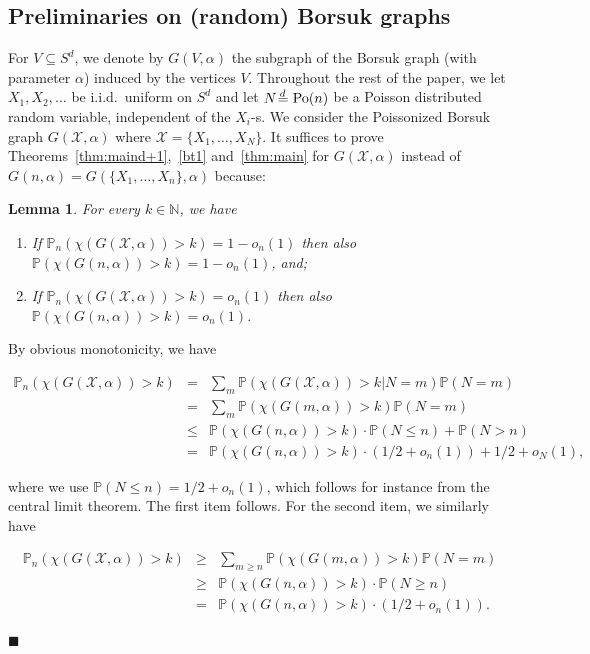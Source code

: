 \documentclass[11pt]{article}%
\newenvironment{proof}{\vspace{1ex}\noindent{\bf Proof.}}{\hspace*{\fill}$\blacksquare$\vspace{1ex}}
\newtheorem{lemma}[lemma]{Lemma}
\newcommand{\Xcal}[0]{\ensuremath{{\mathcal X}}}
\newcommand{\eN}[0]{\ensuremath{ \mathbb N}}
\newcommand{\Pee}[0]{\ensuremath{{\mathbb P}}}
\newcommand{\isd}[0]{\hspace{.2ex} \raisebox{-.1ex}{$=$} \hspace{-1.5ex} 
\raisebox{1ex}{{$\scriptstyle d$}} \hspace{.8ex} }
\DeclareMathOperator{\Po}{Po}
\begin{document}
\subsection{Preliminaries on (random) Borsuk graphs}


For $V \subseteq S^d$, we denote by $G(V,\alpha)$ the subgraph of the Borsuk graph (with parameter $\alpha$) induced
by the vertices $V$.
Throughout the rest of the paper, we let $X_1,X_2,\dots$ be i.i.d.~uniform on $S^d$ and 
let $N \isd \Po(n)$ be a Poisson distributed random 
variable, independent of the $X_i$-s. 
We consider the Poissonized Borsuk graph $G(\Xcal,\alpha)$ where $\Xcal = \{X_1,\dots,X_N\}$.
It suffices to prove Theorems~\ref{thm:maind+1},~\ref{bt1} and~\ref{thm:main} for $G(\Xcal,\alpha)$ instead of 
$G(n,\alpha) = G(\{X_1,\dots,X_n\},\alpha)$ because:

\begin{lemma}\label{lem:transferPo}
For every $k \in \eN$, we have 
\begin{enumerate}
\item If $\Pee_n(\chi(G(\Xcal,\alpha))> k) = 1-o_n(1)$ then also 
$\Pee(\chi(G(n,\alpha))> k) = 1-o_n(1)$, and;
\item If $\Pee_n(\chi(G(\Xcal,\alpha))> k) = o_n(1)$ then also 
$\Pee(\chi(G(n,\alpha))> k) = o_n(1)$.
\end{enumerate}
\end{lemma}

\begin{proof} By obvious monotonicity, we have 

$$ \begin{array}{rcl} 
\Pee_n(\chi(G(\Xcal,\alpha))> k)
& = & \sum_{m} \Pee( \chi(G(\Xcal,\alpha))> k | N = m ) \Pee( N=m )\\
& = & \sum_{m} \Pee( \chi(G(m,\alpha))> k ) \Pee( N=m )\\
& \leq & \Pee( \chi(G(n,\alpha)) > k ) \cdot \Pee( N\leq n) + \Pee( N > n ) \\
& = & \Pee( \chi(G(n,\alpha)) > k ) \cdot (1/2+o_n(1)) + 1/2+o_N(1),
\end{array} $$

\noindent
where we use $\Pee( N \leq n ) = 1/2+o_n(1)$, which follows for instance from the central limit theorem.
The first item follows.
For the second item, we similarly have 


$$ \begin{array}{rcl} 
\Pee_n(\chi(G(\Xcal,\alpha))> k)
& \geq & \sum_{m\geq n} \Pee( \chi(G(m,\alpha))> k ) \Pee( N=m ) \\
& \geq & \Pee( \chi(G(n,\alpha)) > k ) \cdot \Pee( N \geq  n ) \\
& = & \Pee( \chi(G(n,\alpha)) > k ) \cdot (1/2+o_n(1)). 
\end{array} $$

\end{proof}
\end{document}

